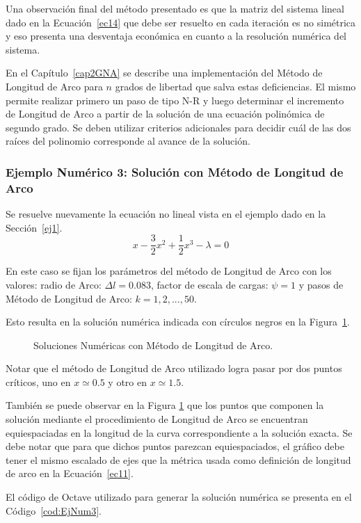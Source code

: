 Una observación final del método presentado es que la matriz del sistema lineal dado en la Ecuación~\eqref{ec14} que debe ser resuelto en cada iteración es no simétrica y eso presenta una desventaja económica en cuanto a la resolución numérica del sistema. 

En el Capítulo~\ref{cap2GNA} se describe una implementación del Método de Longitud de Arco para $n$ grados de libertad que salva estas deficiencias. El mismo permite realizar primero un paso de tipo N-R y luego determinar el incremento de Longitud de Arco a partir de la solución de una ecuación polinómica de segundo grado. Se deben utilizar criterios adicionales para decidir cuál de las dos raíces del polinomio corresponde al avance de la solución.

\subsubsection{Ejemplo Numérico 3: Solución con Método de Longitud de Arco}

Se resuelve nuevamente la ecuación no lineal vista en el ejemplo dado en la Sección~\ref{ej1}.
%
\begin{equation}
x-\frac{3}{2}x^2+\frac{1}{2}x^3-\lambda=0
\end{equation}

En este caso se fijan los parámetros del método de Longitud de Arco con los valores: radio de Arco: $\Delta l = 0.083$, factor de escala de cargas: $\psi = 1$ y pasos de Método de Longitud de Arco: $k=1,2,...,50$.

Esto resulta en la solución numérica indicada con círculos negros en la Figura~\ref{fig:fig6}.

\begin{figure}[htb]
	\centering
	\resizebox{\textwidth}{!}{}
	\caption{Soluciones Numéricas con Método de Longitud de Arco.}
	\label{fig:fig6}
\end{figure}

Notar que el método de Longitud de Arco utilizado logra pasar por dos puntos críticos, uno en $x\simeq 0.5$ y otro en $x\simeq 1.5$.

También se puede observar en la Figura \ref{fig:fig6} que los puntos que componen la solución mediante el procedimiento de Longitud de Arco se encuentran equiespaciadas en la longitud de la curva correspondiente a la solución exacta. Se debe notar que para que dichos puntos parezcan equiespaciados, el gráfico debe tener el mismo escalado de ejes que la métrica usada como definición de longitud de arco en la Ecuación~\eqref{ec11}.

El código de Octave utilizado para generar la solución numérica se presenta en el Código~\ref{cod:EjNum3}.




